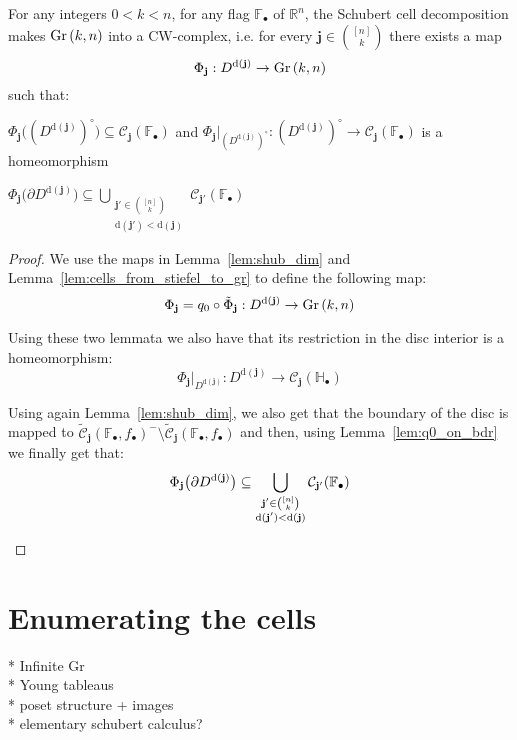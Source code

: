 \begin{theorem}\label{thm:cw_complex} For any integers $0<k<n$, for any flag $\mathbb{F}_{\bullet}$ of $\mathbb{R}^n$, the Schubert cell decomposition makes $\Gr{k}{n}$ into a CW-complex, i.e. for every $\mathbf{j}\in\binom{[n]}{k}$ there exists a map
\[\Phi_{\mathbf{j}}:D^{\mathrm{d}(\mathbf{j})}\to\Gr{k}{n}\]
such that:
\begin{i_enum} \item $\Phi_{\mathbf{j}}\big({\left(D^{\mathrm{d}(\mathbf{j})}\right)}^{\circ}\big)\subseteq\mathcal{C}_{\mathbf{j}}(\mathbb{F}_{\bullet})$ and $\Phi_{\mathbf{j}}|_{{\left(D^{\mathrm{d}(\mathbf{j})}\right)}^{\circ}}:{\left(D^{\mathrm{d}(\mathbf{j})}\right)}^{\circ}\to\mathcal{C}_{\mathbf{j}}(\mathbb{F}_{\bullet})$ is a homeomorphism
\item $\Phi_{\mathbf{j}}\big({\partial D^{\mathrm{d}(\mathbf{j})}}\big)\subseteq\bigcup_{\substack{\mathbf{j}'\in\binom{[n]}{k}\\\mathrm{d}(\mathbf{j}')<\mathrm{d}(\mathbf{j})}}\mathcal{C}_{\mathbf{j}'}(\mathbb{F}_{\bullet})$
\end{i_enum}
\end{theorem}
\begin{proof} We use the maps in Lemma~\ref{lem:shub_dim} and Lemma~\ref{lem:cells_from_stiefel_to_gr} to define the following map:
\[\Phi_{\mathbf{j}}=q_0\circ\tilde{\Phi}_{\mathbf{j}}:D^{\mathrm{d}(\mathbf{j})}\to\Gr{k}{n}\]
\begin{i_enum}
\item Using these two lemmata we also have that its restriction in the disc interior is a homeomorphism:
\[\Phi_{\mathbf{j}}|_{D^{\mathrm{d}(\mathbf{j})}}:D^{\mathrm{d}(\mathbf{j})}\to\mathcal{C}_{\mathbf{j}}(\mathbb{H}_{\bullet})\]
\item Using again Lemma~\ref{lem:shub_dim}, we also get that the boundary of the disc is mapped to $\tilde{\mathcal{C}}_{\mathbf{j}}(\mathbb{F}_{\bullet},f_{\bullet})^-\setminus\tilde{\mathcal{C}}_{\mathbf{j}}(\mathbb{F}_{\bullet},f_{\bullet})$ and then, using Lemma~\ref{lem:q0_on_bdr} we finally get that:
\[\Phi_{\mathbf{j}}\big({\partial D^{\mathrm{d}(\mathbf{j})}}\big)\subseteq\bigcup_{\substack{\mathbf{j}'\in\binom{[n]}{k}\\\mathrm{d}(\mathbf{j}')<\mathrm{d}(\mathbf{j})}}\mathcal{C}_{\mathbf{j}'}(\mathbb{F}_{\bullet})\qedhere\]
\end{i_enum}
\end{proof}

\section{Enumerating the cells}
* Infinite Gr\\
* Young tableaus\\
* poset structure + images\\
* elementary schubert calculus?
